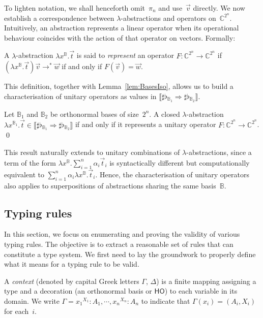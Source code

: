 \documentclass[a4paper,UKenglish,numberwithinsect,pdfa,anonymous]{lipics-v2021}
\theoremstyle{restatestyle}
\newcommand\lra{\longrightarrow}
\newcommand\AbsBasis{\ensuremath{\mathsf{H\!O}}}
\def\C{\mathbb{C}}            %
\def\Lam#1#2#3{\lambda#1^{#2}{.}#3} %
\def\eval{\lra^*}
\def\BB{\mathbb{B}}
\def\Arr{\Rightarrow}
\def\sem#1{\llbracket#1\rrbracket}
\newcommand\basis[1]{\ensuremath{\flat_{#1}}}
\begin{document}
To lighten notation, we shall henceforth omit~$\pi_n$ and use~$\vec v$
directly. We now establish a correspondence between $\lambda$-abstractions and operators
on~$\C^{2^n}$. Intuitively, an abstraction represents a linear operator when its
operational behaviour coincides with the action of that operator on vectors.
Formally:

\begin{definition}
  A $\lambda$-abstraction $\Lam{x}{{\BB}}{\vec{t}}$ is said to \emph{represent}
  an operator $F:\C^{2^n}\to\C^{2^n}$ if
    $(\Lam{x}{{\BB}}{\vec{t}})\vec{v} \eval \vec{w}$
    if and only if
    $F(\vec{v}) = \vec{w}$.
\end{definition}

This definition, together with Lemma~\ref{lem:BasesIso}, allows us to build a
characterisation of unitary operators as values in
$\sem{\sharp\basis{\BB_1}\Arr\sharp\basis{\BB_2}}$.

\begin{theorem}\label{thm:characterisation}
  Let $\BB_1$ and $\BB_2$ be orthonormal bases of size~$2^n$.
  A closed $\lambda$-abstraction
  $\Lam{x}{{\BB_1}}{\vec{t}}\in\sem{\sharp\basis{\BB_1}\Arr\sharp\basis{\BB_2}}$
  if and only if it represents a unitary operator
  $F:\C^{2^n}\to\C^{2^n}$.
  \qed
\end{theorem}

This result naturally extends to unitary combinations of
$\lambda$-ab\-strac\-tions, since a term of the form
$\Lam{x}{{\BB}}{\sum_{i=1}^{n}\alpha_i \vec{t}_{i}}$ is syntactically different
but computationally equivalent to $\sum_{i=1}^{n}\alpha_i
\Lam{x}{{\BB}}{\vec{t}_{i}}$.  Hence, the characterisation of unitary operators
also applies to superpositions of abstractions sharing the same basis~$\BB$.

\subsection{Typing rules}    
In this section, we focus on enumerating and proving the validity of various
typing rules. The objective is to extract a reasonable set of rules that can
constitute a type system. We first need to lay the groundwork to properly define
what it means for a typing rule to be valid.

\begin{definition}
  A \emph{context} (denoted by capital Greek letters $\Gamma$, $\Delta$) is a
  finite mapping assigning a type and a decoration (an orthonormal basis or $\AbsBasis$)
  to each variable in its domain. We write
  \(
    \Gamma = {x_1}^{{X_1}}:A_1,\dotsb, {x_n}^{{X_n}}:A_n
  \)
  to indicate that $\Gamma(x_i)=(A_i,X_i)$ for each~$i$.
\end{definition}
\end{document}
